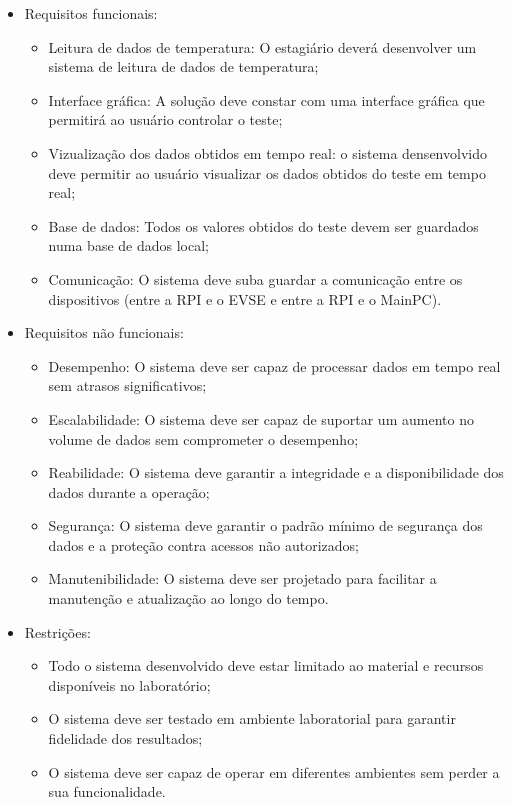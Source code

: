 \begin{itemize}
    \item[] Requisitos funcionais:
        \begin{itemize}
            \item Leitura de dados de temperatura: O estagiário deverá desenvolver um sistema de leitura de dados de temperatura; 
            \item Interface gráfica: A solução deve constar com uma interface gráfica que permitirá ao usuário controlar o teste;
            \item Vizualização dos dados obtidos em tempo real: o sistema densenvolvido deve permitir ao usuário visualizar os dados obtidos do 
            teste em tempo real;
            \item Base de dados: Todos os valores obtidos do teste devem ser guardados numa base de dados local;
            \item Comunicação: O sistema deve suba guardar a comunicação entre os dispositivos (entre a RPI e o EVSE e entre a RPI e o MainPC).
        \end{itemize}
    \item[] Requisitos não funcionais:
        \begin{itemize}
            \item Desempenho: O sistema deve ser capaz de processar dados em tempo real sem atrasos significativos;
            \item Escalabilidade: O sistema deve ser capaz de suportar um aumento no volume de dados sem comprometer o desempenho;
            \item Reabilidade: O sistema deve garantir a integridade e a disponibilidade dos dados durante a operação;
            \item Segurança: O sistema deve garantir o padrão mínimo de segurança dos dados e a proteção contra acessos não autorizados;
            \item Manutenibilidade: O sistema deve ser projetado para facilitar a manutenção e atualização ao longo do tempo.
        \end{itemize}
    \item[] Restrições:
        \begin{itemize}
            \item Todo o sistema desenvolvido deve estar limitado ao material e recursos disponíveis no laboratório;
            \item O sistema deve ser testado em ambiente laboratorial para garantir fidelidade dos resultados;
            \item O sistema deve ser capaz de operar em diferentes ambientes sem perder a sua funcionalidade.
        \end{itemize}
\end{itemize}
    
